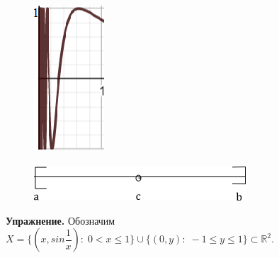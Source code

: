 \documentclass[12pt,a4paper]{article}
\begin{document}
\begin{figure}
	\includegraphics[width=0.8\linewidth]{lect8_9.png}
	\\ \; \\
	\includegraphics[width=0.8\linewidth]{lect8_10.png}
\end{figure}

\textbf{Упражнение.} Обозначим $X = \{(x, sin\dfrac{1}{x}): \; 0 < x \leq 1\} \cup \{(0, y): \; -1 \leq y \leq 1\} \subset \mathbb{R}^{2}.$ 
\end{document}
